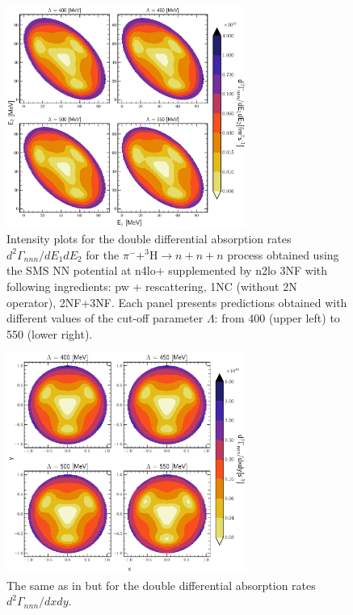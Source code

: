     \begin{figure}[h]
        \begin{center}
        \includegraphics[width=0.7\textwidth]{PlotData/PION/Dalitz_maps/figures/Dalitz_map_nnn_E1E2_cutofs_1NC.pdf}
        \end{center}
        \caption{Intensity plots for the double differential absorption rates
        $d^2 \Gamma_{nnn}/dE_1dE_2$ for the $\pi^- + ^3\text{H} \rightarrow n + n + n$
        process obtained using the SMS NN potential at \gls{n4lo+} supplemented by \gls{n2lo} 3NF
        with following ingredients: \gls{pw} + rescattering, 1NC (without 2N operator), 2NF+3NF.
        Each panel presents predictions obtained with different values of the cut-off parameter $\Lambda$:
        from \SI{400}{\mev} (upper left) to \SI{550}{\mev} (lower right).}
        \label{pion_nnn_E1E2_cutoff_1NC}
    \end{figure}

    \begin{figure}[h]
        \begin{center}
        \includegraphics[width=0.7\textwidth]{PlotData/PION/Dalitz_maps/figures/Dalitz_map_nnn_xy_cutofs_1NC.pdf}
        \end{center}
        \caption{The same as in  but for the double differential absorption rates
        $d^2 \Gamma_{nnn}/dxdy$.}
        \label{pion_nnn_xy_cutoff_1NC}
    \end{figure}

